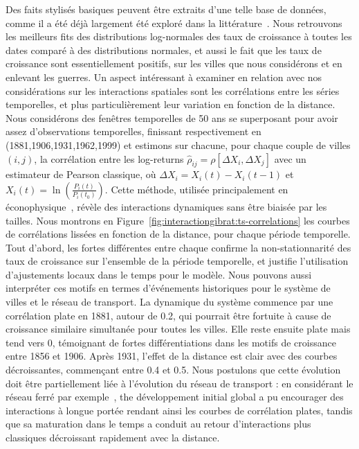 {Des faits stylisés basiques peuvent être extraits d'une telle base de données, comme il a été déjà largement été exploré dans la littérature~\cite{guerin1990150}. Nous retrouvons les meilleurs fits des distributions log-normales des taux de croissance à toutes les dates comparé à des distributions normales, et aussi le fait que les taux de croissance sont essentiellement positifs, sur les villes que nous considérons et en enlevant les guerres. Un aspect intéressant à examiner en relation avec nos considérations sur les interactions spatiales sont les corrélations entre les séries temporelles, et plus particulièrement leur variation en fonction de la distance. Nous considérons des fenêtres temporelles de 50 ans se superposant pour avoir assez d'observations temporelles, finissant respectivement en (1881,1906,1931,1962,1999) et estimons sur chacune, pour chaque couple de villes $(i,j)$, la corrélation entre les log-returns $\hat{\rho}_{ij}=\rho\left[\Delta X_i, \Delta X_j\right]$ avec un estimateur de Pearson classique, où $\Delta X_i = X_i(t) - X_i(t-1)$ et $X_i(t) = \ln\left(\frac{P_i(t)}{P_i(t_0)}\right)$. Cette méthode, utilisée principalement en éconophysique~\cite{mantegna1999introduction}, révèle des interactions dynamiques sans être biaisée par les tailles. Nous montrons en Figure~\ref{fig:interactiongibrat:ts-correlations} les courbes de corrélations lissées en fonction de la distance, pour chaque période temporelle. Tout d'abord, les fortes différentes entre chaque confirme la non-stationnarité des taux de croissance sur l'ensemble de la période temporelle, et justifie l'utilisation d'ajustements locaux dans le temps pour le modèle. Nous pouvons aussi interpréter ces motifs en termes d'événements historiques pour le système de villes et le réseau de transport. La dynamique du système commence par une corrélation plate en 1881, autour de 0.2, qui pourrait être fortuite à cause de croissance similaire simultanée pour toutes les villes. Elle reste ensuite plate mais tend vers 0, témoignant de fortes différentiations dans les motifs de croissance entre 1856 et 1906. Après 1931, l'effet de la distance est clair avec des courbes décroissantes, commençant entre 0.4 et 0.5. Nous postulons que cette évolution doit être partiellement liée à l'évolution du réseau de transport : en considérant le réseau ferré par exemple~\cite{thevenin2013mapping}, the développement initial global a pu encourager des interactions à longue portée rendant ainsi les courbes de corrélation plates, tandis que sa maturation dans le temps a conduit au retour d'interactions plus classiques décroissant rapidement avec la distance.
}


